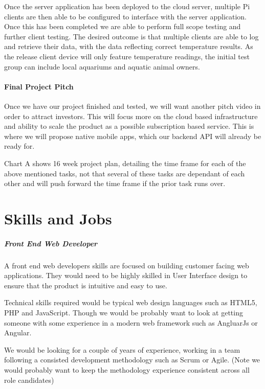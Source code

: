 \documentclass[11pt, oneside, a4paper, titlepage]{article}
\begin{document}
Once the server application has been deployed to the cloud server, multiple Pi clients are then able to be configured to interface with the server application. Once this has been completed we are able to perform full scope testing and further client testing. The desired outcome is that multiple clients are able to log and retrieve their data, with the data reflecting correct temperature results. As the release client device will only feature temperature readings, the initial test group can include local aquariums and aquatic animal owners. 

\subsection{Final Project Pitch}
Once we have our project finished and tested, we will want another pitch video in order to attract investors.  This will focus more on the cloud based infrastructure and ability to scale the product as a possible subscription based service.  This is where we will propose native mobile apps, which our backend API will already be ready for.  

Chart A shows 16 week project plan, detailing the time frame for each of the above mentioned tasks, not that several of these tasks are dependant of each other and will push forward the time frame if the prior task runs over. 



\part{Skills and Jobs}
\subsubsection{Front End Web Developer}
A front end web developers skills are focused on building customer facing web applications. They would need to be highly skilled in User Interface design to ensure that the product is intuitive and easy to use. 

Technical skills required would be typical web design languages such as HTML5, PHP and JavaScript. Though we would be probably want to look at getting someone with some experience in a modern web framework such as AngluarJs or Angular. 

We would be looking for a couple of years of experience, working in a team following a consisted development methodology such as Scrum or Agile.  (Note we would probably want to keep the methodology experience consistent across all role candidates)  
\end{document}

